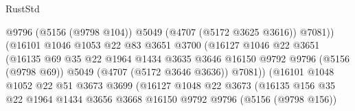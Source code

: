 \begin{lexlean}{RustStd}
\begin{coremodule}
                                        @9796
                                        (@5156 (@9798 @104))
                                        @5049
                                        (@4707 (@5172 @3625 @3616))
                                        @7081))
                                    (@16101
                                      @1046
                                      @1053
                                      @22
                                      @83
                                      @3651
                                      @3700
                                      (@16127
                                        @1046
                                        @22
                                        @3651
                                        (@16135
                                          @69
                                          @35
                                          @22
                                          @1964
                                          @1434
                                          @3635
                                          @3646
                                          @16150
                                          @9792
                                          @9796
                                          (@5156 (@9798 @69))
                                          @5049
                                          (@4707 (@5172 @3646 @3636))
                                          @7081))
                                      (@16101
                                        @1048
                                        @1052
                                        @22
                                        @51
                                        @3673
                                        @3699
                                        (@16127
                                          @1048
                                          @22
                                          @3673
                                          (@16135
                                            @156
                                            @35
                                            @22
                                            @1964
                                            @1434
                                            @3656
                                            @3668
                                            @16150
                                            @9792
                                            @9796
                                            (@5156 (@9798 @156))

\end{coremodule}
\end{lexlean}
